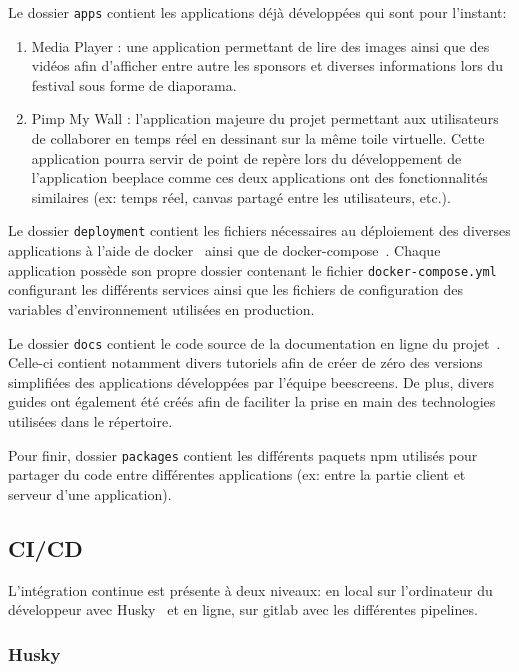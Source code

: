 Le dossier \texttt{apps} contient les applications déjà développées qui sont pour l'instant:

\begin{enumerate}
  \item Media Player : une application permettant de lire des images ainsi que des vidéos afin d'afficher entre autre les sponsors et diverses informations lors du festival sous forme de diaporama.
  \item Pimp My Wall : l'application majeure du projet permettant aux utilisateurs de collaborer en temps réel en dessinant sur la même toile virtuelle. Cette application pourra servir de point de repère lors du développement de l'application \gls{beeplace} comme ces deux applications ont des fonctionnalités similaires (ex: temps réel, canvas partagé entre les utilisateurs, etc.).
\end{enumerate}

Le dossier \texttt{deployment} contient les fichiers nécessaires au déploiement des diverses applications à l'aide de \gls{docker}~\cite{docker} ainsi que de \gls{docker-compose}~\cite{docker-compose}. Chaque application possède son propre dossier contenant le fichier  \texttt{docker-compose.yml} configurant les différents services ainsi que les fichiers de configuration des variables d'environnement utilisées en production.

Le dossier \texttt{docs} contient le code source de la documentation en ligne du projet~\cite{beescreensdocs}. Celle-ci contient notamment divers tutoriels afin de créer de zéro des versions simplifiées des applications développées par l'équipe \gls{beescreens}. De plus, divers guides ont également été créés afin de faciliter la prise en main des technologies utilisées dans le répertoire.

Pour finir, dossier \texttt{packages} contient les différents paquets \gls{npm} utilisés pour partager du code entre différentes applications (ex: entre la partie client et serveur d'une application).

\subsection{CI/CD}

L'intégration continue est présente à deux niveaux: en local sur l'ordinateur du développeur avec Husky~\cite{husky} et en ligne, sur \gls{gitlab} avec les différentes pipelines.

\subsubsection{Husky}


